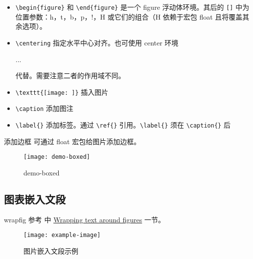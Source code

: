 \documentclass[final]{ctexbeamer}
\begin{document}
\begin{frame}[fragile]
\begin{itemize}
  \item \verb+\begin{figure}+ 和 \verb+\end{figure}+ 是一个 figure 浮动体环境。其后的 \verb+[]+ 中为位置参数：h，t，b，p，!，H 或它们的组合（H 依赖于宏包 float 且将覆盖其余选项）。
  \item \verb+\centering+ 指定水平中心对齐。也可使用 center 环境 \\
\begin{texlst}[numbers=none]
\begin{center}
...
\end{center}
\end{texlst}
    代替。需要注意二者的作用域不同。
  \item \verb+\texttt{[image: ]}+ 插入图片
  \item \verb+\caption+ 添加图注
  \item \verb+\label{}+ 添加标签。通过 \verb+\ref{}+ 引用。\verb+\label{}+ 须在 \verb+\caption{}+ 后
\end{itemize}
\end{frame}


\begin{frame}[fragile]{添加边框}
可通过 float 宏包给图片添加边框。
\end{frame}


\begin{frame}
\begin{figure}[]
  \centering
  \texttt{[image: demo-boxed]}
  \caption{demo-boxed}
  \label{demo-boxed}
\end{figure}
\end{frame}


\subsection{图表嵌入文段}
% 
\begin{frame}[fragile]{wrapfig}
参考 \cite{wiki:floats} 中 \href{https://en.wikibooks.org/wiki/LaTeX/Floats,\_Figures\_and\_Captions#Wrapping\_text\_around\_figures}{Wrapping text around figures} 一节。
\begin{vertlst}
\small\zhlipsum[2][name=nanshanjing]
\begin{wrapfigure}{r}{.4\textwidth}
  \vspace{-12pt}\centering
  \texttt{[image: example-image]}
  \caption{图片嵌入文段示例}
\end{wrapfigure}
\zhlipsum[3][name=nanshanjing]
\end{vertlst}
\end{frame}
\end{document}
